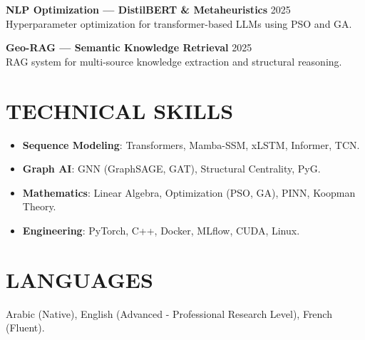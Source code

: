 \documentclass[a4paper,11pt]{article}
\begin{document}
\textbf{NLP Optimization — DistilBERT \& Metaheuristics} \hfill 2025 \\
Hyperparameter optimization for transformer-based LLMs using PSO and GA.

\textbf{Geo-RAG — Semantic Knowledge Retrieval} \hfill 2025 \\
RAG system for multi-source knowledge extraction and structural reasoning.

\section{TECHNICAL SKILLS}
\begin{itemize}
    \item \textbf{Sequence Modeling}: Transformers, Mamba-SSM, xLSTM, Informer, TCN.
    \item \textbf{Graph AI}: GNN (GraphSAGE, GAT), Structural Centrality, PyG.
    \item \textbf{Mathematics}: Linear Algebra, Optimization (PSO, GA), PINN, Koopman Theory.
    \item \textbf{Engineering}: PyTorch, C++, Docker, MLflow, CUDA, Linux.
\end{itemize}

\section{LANGUAGES}
Arabic (Native), English (Advanced - Professional Research Level), French (Fluent).
\end{document}
